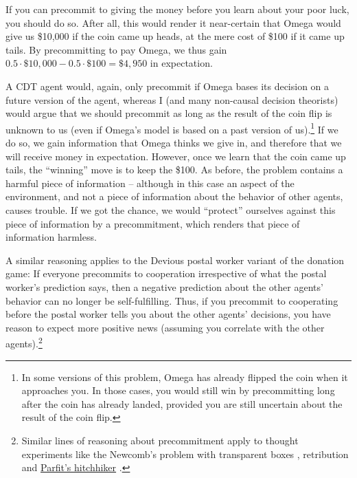 If you can precommit to giving the money before you learn about your
poor luck, you should do so. After all, this would render it
near-certain that Omega would give us \$10,000 if the coin came up
heads, at the mere cost of \$100 if it came up tails. By precommitting to
pay Omega, we thus gain
$0.5 \cdot \$ 10{,}000  - 0.5 \cdot \$ 100 = \$ 4{,}950$ in
expectation.

A CDT agent would, again, only precommit if Omega bases its decision on
a future version of the agent, whereas I (and many non-causal decision
theorists) would argue that we should precommit as long as the result of
the coin flip is unknown to us (even if Omega's model is based on a past
version of us).\footnote{In some versions of this problem, Omega has
  already flipped the coin when it approaches you. In those cases, you
  would still win by precommitting long after the coin has already
  landed, provided you are still uncertain about the result of the coin
  flip.} If we do so, we gain information that Omega thinks we give in,
and therefore that we will receive money in expectation. However, once
we learn that the coin came up tails, the ``winning'' move is to keep
the \$100. As before, the problem contains a harmful piece of
information -- although in this case an aspect of the environment, and
not a piece of information about the behavior of other agents, causes
trouble. If we got the chance, we would ``protect'' ourselves against
this piece of information by a precommitment, which renders that piece
of information harmless.

A similar reasoning applies to the Devious postal worker variant of the
donation game: If everyone precommits to cooperation irrespective of
what the postal worker's prediction says, then a negative prediction
about the other agents' behavior can no longer be self-fulfilling. Thus,
if you precommit to cooperating before the postal worker tells you about
the other agents' decisions, you have reason to expect more positive
news (assuming you correlate with the other agents).\footnote{Similar
  lines of reasoning about precommitment apply to thought experiments
  like the Newcomb's problem with transparent boxes
  \parencite{Drescher2006-ky}, retribution
  \parencite{Drescher2006-ky} and
  \href{https://wiki.lesswrong.com/wiki/Parfit\%27s_hitchhiker}{Parfit's
  hitchhiker} \parencite{Parfit1984-ne}.}

